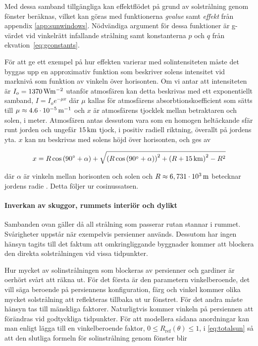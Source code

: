 Med dessa samband tillgängliga kan effektflödet på grund av solstrålning genom fönster beräknas, vilket kan göras med funktionerna \textit{gvalue} samt \textit{effekt} från appendix \ref{app:sunwindows}. Nödvändiga argument för dessa funktioner är g-värdet vid vinkelrätt infallande strålning samt konstanterna $p$ och $q$ från ekvation~\eqref{eq:gconstants}. %

För att ge ett exempel på hur effekten varierar med solintensiteten måste det byggas upp en approximativ funktion som beskriver solens intensitet vid marknivå som funktion av vinkeln över horisonten. Om vi antar att intensiteten är $I_o = \unit[1370]{Wm^{-2}}$\cite{physicshandbook} utanför atmosfären kan detta beskrivas med ett exponentiellt samband, $I = I_oe^{-\mu x}$ där $\mu$ kallas för atmosfärens absorbtionskoefficient som sätts till $\mu\approx \unit[4.6\cdot 10^{-5}]{m^{-1}}$ och $x$ är atmosfärens tjocklek mellan betraktaren och solen, i meter. Atmosfären antas dessutom vara som en homogen heltäckande sfär runt jorden och ungefär $\unit[15]{km}$ tjock, i positiv radiell riktning, överallt på jordens yta. $x$ kan nu beskrivas med solens höjd över horisonten, och ges av

\begin{equation}
x = R\cos{(90^\circ+\alpha)} + \sqrt{\left(R\cos{(90^\circ+\alpha)}\right)^2 + \left( R+\unit[15]{km}\right)^2 - R^2}
\end{equation}

där $\alpha$ är vinkeln mellan horisonten och solen och $R\approx\unit[6,731\cdot 10^3]{m}$ betecknar jordens radie \cite{physicshandbook}. Detta följer ur cosinussatsen. %

\paragraph{Inverkan av skuggor, rummets interiör och dylikt}

Sambanden ovan gäller då all strålning som passerar rutan stannar i rummet. Svårigheter uppstår när exempelvis persienner används. Dessutom har ingen hänsyn tagits till det faktum att omkringliggande byggnader kommer att blockera den direkta solstrålningen vid vissa tidpunkter.

Hur mycket av solinstrålningen som blockeras av persienner och gardiner är oerhört svårt att räkna ut. För det första är den parametern vinkelberoende, det vill säga beroende på persiennens konfiguration, färg och vinkel kommer olika mycket solstrålning att reflekteras tillbaka ut ur fönstret. För det andra måste hänsyn tas till mänskliga faktorer. Naturligtvis kommer vinkeln på persiennen att förändras vid godtyckliga tidpunkter. För att modellera sådana anordningar kan man enligt \cite{ASHRAE09} lägga till en vinkelberoende faktor, $0 \le R_\text{ref}\left( \theta \right) \le 1$, i \eqref{eq:totalsun} så att den slutliga formeln för solinstrålning genom fönster blir


